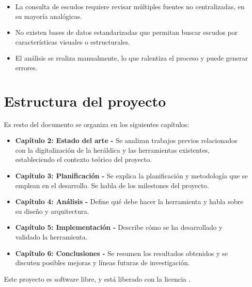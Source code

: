 \begin{itemize}
    \item La consulta de escudos requiere revisar múltiples fuentes no centralizadas, 
    en su mayoría analógicas.
    \item No existen bases de datos estandarizadas que permitan buscar escudos por
    características visuales o estructurales.
    \item El análisis se realiza manualmente, lo que ralentiza el proceso y puede
    generar errores.
\end{itemize}

\section{Estructura del proyecto}
Es resto del documento se organiza en los siguientes capítulos:

\begin{itemize}
    \item \textbf{Capítulo 2: Estado del arte - }Se analizan trabajos previos relacionados
    con la digitalización de la heráldica y las herramientas existentes, estableciendo
    el contexto teórico del proyecto.
    \item \textbf{Capítulo 3: Planificación - }Se explica la planificación y metodología
    que se emplean en el desarrollo. Se habla de los milestones del proyecto.
    \item \textbf{Capítulo 4: Análisis - }Define qué debe hacer la herramienta y habla
    sobre su diseño y arquitectura.
    \item \textbf{Capítulo 5: Implementación - }Describe cómo se ha desarrollado y validado
    la herramienta. 
    \item \textbf{Capítulo 6: Conclusiones - }Se resumen los resultados obtenidos y se
    discuten posibles mejoras y líneas futuras de investigación.
\end{itemize}

Este proyecto es software libre, y está liberado con la licencia \cite{gplv3}.